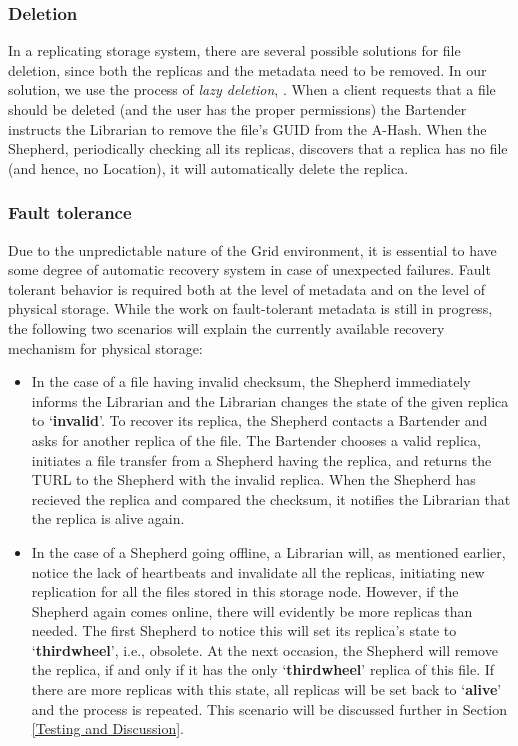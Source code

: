 \documentclass[final]{ieee}
\begin{document}
\subsubsection{Deletion}
\label{Deletion}
In a replicating storage system, there are several possible solutions
for file deletion, since both the replicas and the metadata need to be
removed. In our solution, we use the process of \textit{lazy
  deletion}, \cite{LazyDeletion}. When a client requests that a file
should be deleted (and the user has the proper permissions) the
Bartender instructs the Librarian to remove the file's GUID from the
A-Hash. When the Shepherd, periodically checking all its replicas,
discovers that a replica has no file (and hence, no Location), it will
automatically delete the replica.

\subsubsection{Fault tolerance}
\label{Fault tolerance}

Due to the unpredictable nature of the Grid environment, it is essential to
have some degree of  automatic recovery system in case of unexpected
failures. Fault tolerant behavior is required both at the level of
metadata and on the level of physical storage. While the work on fault-tolerant metadata is still in
progress, the following two
scenarios will explain the currently available recovery mechanism for
physical storage: 
\begin{itemize}
\item In the case of a file having invalid checksum, the Shepherd
immediately informs the Librarian and the Librarian changes the state of the given replica to
`\textbf{invalid}'. To recover its replica, the Shepherd contacts a
Bartender and asks for another replica of the file. The Bartender chooses a valid
replica, initiates a file transfer from a Shepherd having the replica,
and returns the TURL to the Shepherd with the invalid replica. When the
Shepherd has recieved the replica and compared the checksum, it notifies the
Librarian that the replica is alive again.  
\item In the case of a Shepherd going offline, a Librarian will,
  as mentioned earlier, notice the lack of heartbeats and invalidate all the
  replicas, initiating new replication for all the files stored in
  this storage node. However, if the Shepherd
  again comes online, there will evidently be more replicas than
  needed. The first Shepherd to notice this will set its replica's
  state to `\textbf{thirdwheel}', i.e., obsolete. At the next occasion,
  the Shepherd will remove the replica, if and only if it has the only
  `\textbf{thirdwheel}' replica of this file. If there are more
  replicas with this state, all replicas will be set back to
  `\textbf{alive}' and the process is repeated. This scenario will be discussed further in Section
  \ref{Testing and Discussion}.
\end{itemize}
\end{document}
